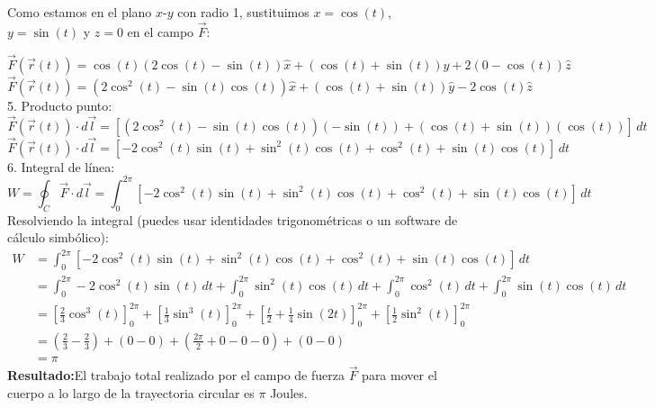 \documentclass{article}
\begin{document}
Como estamos en el plano $x$-$y$ con radio 1, sustituimos $x = \cos(t)$, $y = \sin(t)$ y $z = 0$ en el campo $\vec{F}$:

\[
\vec{F}(\vec{r}(t)) = \cos(t)(2\cos(t)-\sin(t))\hat{x} + (\cos(t)+\sin(t))\hat{y} + 2(0-\cos(t))\hat{z}
\]
\[
\vec{F}(\vec{r}(t)) = (2\cos^2(t) - \sin(t)\cos(t))\hat{x} + (\cos(t) + \sin(t))\hat{y} - 2\cos(t)\hat{z}
\]
5. Producto punto:
\[
\vec{F}(\vec{r}(t)) \cdot d\vec{l} = [(2\cos^2(t) - \sin(t)\cos(t))(-\sin(t)) + (\cos(t) + \sin(t))(\cos(t))] \, dt
\]
\[
\vec{F}(\vec{r}(t)) \cdot d\vec{l} = [-2\cos^2(t)\sin(t) + \sin^2(t)\cos(t) + \cos^2(t) + \sin(t)\cos(t)] \, dt
\]
6. Integral de línea:
\[
W = \oint_C \vec{F} \cdot d\vec{l} = \int_0^{2\pi} [-2\cos^2(t)\sin(t) + \sin^2(t)\cos(t) + \cos^2(t) + \sin(t)\cos(t)] \, dt
\]
Resolviendo la integral (puedes usar identidades trigonométricas o un software de cálculo simbólico):
\[
\begin{aligned}
    W &= \int_0^{2\pi} [-2\cos^2(t)\sin(t) + \sin^2(t)\cos(t) + \cos^2(t) + \sin(t)\cos(t)] \, dt \\
    &= \int_0^{2\pi} -2\cos^2(t)\sin(t) \, dt + \int_0^{2\pi} \sin^2(t)\cos(t) \, dt + \int_0^{2\pi} \cos^2(t) \, dt + \int_0^{2\pi} \sin(t)\cos(t) \, dt \\
    &= \left[\frac{2}{3}\cos^3(t)\right]_0^{2\pi} + \left[\frac{1}{3}\sin^3(t)\right]_0^{2\pi} + \left[\frac{t}{2} + \frac{1}{4}\sin(2t)\right]_0^{2\pi} + \left[\frac{1}{2}\sin^2(t)\right]_0^{2\pi} \\
    &= \left(\frac{2}{3} - \frac{2}{3}\right) + (0 - 0) + \left(\frac{2\pi}{2} + 0 - 0 - 0\right) + (0 - 0) \\
    &= \pi
\end{aligned}
\]
\textbf{Resultado:}El trabajo total realizado por el campo de fuerza $\vec{F}$ para mover el cuerpo a lo largo de la trayectoria circular es $\pi$ Joules.
\end{document}
